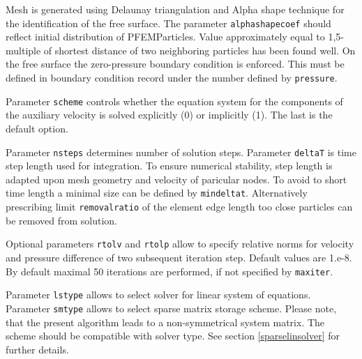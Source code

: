 \documentclass[a4paper]{article}
\newcommand{\param}[1]{\texttt{#1}} %
\begin{document}
Mesh is generated using Delaunay triangulation and Alpha shape technique
for the identification of the free surface. The parameter
\param{alphashapecoef} should reflect initial distribution of PFEMParticles.
Value approximately equal to 1,5-multiple of shortest distance of two 
neighboring particles has been found well. On the free surface the zero-pressure
boundary condition is enforced. This  must be defined in boundary condition
record under the number defined by \param{pressure}.

Parameter \param{scheme} controls whether the  equation system for the 
components of the auxiliary velocity is solved explicitly (0) or implicitly
(1). The last is the default option.

Parameter \param{nsteps} determines number of solution
steps. Parameter \param{deltaT} is time step length used for
integration. To ensure numerical stability, step length is adapted upon mesh
geometry and velocity of paricular nodes. To avoid to short time length a minimal
size can be defined by \param{mindeltat}. Alternatively prescribing limit
\param{removalratio} of the element edge length too close particles can be removed
from solution.

Optional parameters \param{rtolv} and \param{rtolp} allow to
specify relative norms for velocity and pressure difference of two subsequent iteration
step. Default values are 1.e-8. By default maximal 50 iterations are performed, if
not specified by \param{maxiter}.

Parameter \param{lstype} allows to select solver for linear system of
equations. Parameter \param{smtype} allows to select sparse matrix storage
scheme. Please note, that the present algorithm leads to a
non-symmetrical system
matrix. The scheme should be compatible with solver type. See section
\ref{sparselinsolver} for further details.
\end{document}
